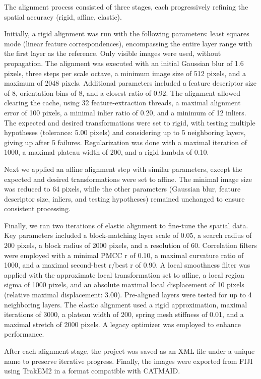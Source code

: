 \documentclass[
  11pt,
]{article}
\begin{document}
The alignment process consisted of three stages, each progressively
refining the spatial accuracy (rigid, affine, elastic).

Initially, a rigid alignment was run with the following parameters:
least squares mode (linear feature correspondences), encompassing the
entire layer range with the first layer as the reference. Only visible
images were used, without propagation. The alignment was executed with
an initial Gaussian blur of 1.6 pixels, three steps per scale octave, a
minimum image size of 512 pixels, and a maximum of 2048 pixels.
Additional parameters included a feature descriptor size of 8,
orientation bins of 8, and a closest ratio of 0.92. The alignment
allowed clearing the cache, using 32 feature-extraction threads, a
maximal alignment error of 100 pixels, a minimal inlier ratio of 0.20,
and a minimum of 12 inliers. The expected and desired transformations
were set to rigid, with testing multiple hypotheses (tolerance: 5.00
pixels) and considering up to 5 neighboring layers, giving up after 5
failures. Regularization was done with a maximal iteration of 1000, a
maximal plateau width of 200, and a rigid lambda of 0.10.

Next we applied an affine alignment step with similar parameters, except
the expected and desired transformations were set to affine. The minimal
image size was reduced to 64 pixels, while the other parameters
(Gaussian blur, feature descriptor size, inliers, and testing
hypotheses) remained unchanged to ensure consistent processing.

Finally, we ran two iterations of elastic alignment to fine-tune the
spatial data. Key parameters included a block-matching layer scale of
0.05, a search radius of 200 pixels, a block radius of 2000 pixels, and
a resolution of 60. Correlation filters were employed with a minimal
PMCC r of 0.10, a maximal curvature ratio of 1000, and a maximal
second-best r/best r of 0.90. A local smoothness filter was applied with
the approximate local transformation set to affine, a local region sigma
of 1000 pixels, and an absolute maximal local displacement of 10 pixels
(relative maximal displacement: 3.00). Pre-aligned layers were tested
for up to 4 neighboring layers. The elastic alignment used a rigid
approximation, maximal iterations of 3000, a plateau width of 200,
spring mesh stiffness of 0.01, and a maximal stretch of 2000 pixels. A
legacy optimizer was employed to enhance performance.

After each alignment stage, the project was saved as an XML file under a
unique name to preserve iterative progress. Finally, the images were
exported from FIJI using TrakEM2 in a format compatible with CATMAID.
\end{document}
